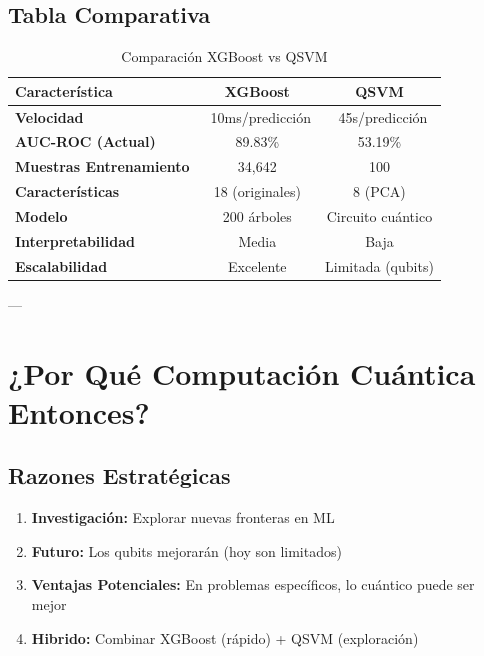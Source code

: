 \documentclass[11pt,a4paper,spanish]{article}
\begin{document}
\subsection{Tabla Comparativa}

\begin{table}[H]
\centering
\begin{tabular}{|l|c|c|}
\hline
\textbf{Característica} & \textbf{XGBoost} & \textbf{QSVM} \\
\hline
\textbf{Velocidad} & ~10ms/predicción & ~45s/predicción \\
\hline
\textbf{AUC-ROC (Actual)} & 89.83\% & 53.19\% \\
\hline
\textbf{Muestras Entrenamiento} & 34,642 & 100 \\
\hline
\textbf{Características} & 18 (originales) & 8 (PCA) \\
\hline
\textbf{Modelo} & 200 árboles & Circuito cuántico \\
\hline
\textbf{Interpretabilidad} & Media & Baja \\
\hline
\textbf{Escalabilidad} & Excelente & Limitada (qubits) \\
\hline
\end{tabular}
\caption{Comparación XGBoost vs QSVM}
\end{table}

---

\section{¿Por Qué Computación Cuántica Entonces?}

\subsection{Razones Estratégicas}

\begin{enumerate}
    \item \textbf{Investigación:} Explorar nuevas fronteras en ML
    \item \textbf{Futuro:} Los qubits mejorarán (hoy son limitados)
    \item \textbf{Ventajas Potenciales:} En problemas específicos, lo cuántico puede ser mejor
    \item \textbf{Hibrido:} Combinar XGBoost (rápido) + QSVM (exploración)
\end{enumerate}
\end{document}
